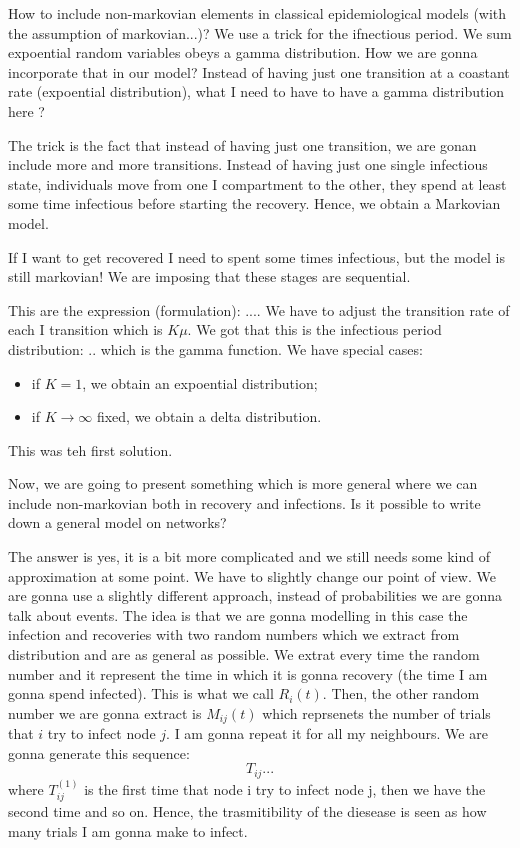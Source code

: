\documentclass[../main/main.tex]{subfiles}
\begin{document}
How to include non-markovian elements in classical epidemiological models (with the assumption of markovian...)?
We use a trick for the ifnectious period. We sum expoential random variables obeys a gamma distribution.
How we are gonna incorporate that in our model? Instead of having just one transition at a coastant rate (expoential distribution), what I need to have to have a gamma distribution here ?

The trick is the fact that instead of having just one transition, we are gonan include more and more transitions. Instead of having just one single infectious state, individuals move from one I compartment to the other, they spend at least some time infectious before starting the recovery. Hence, we obtain a Markovian model.

If I want to get recovered I need to spent some times infectious, but the model is still markovian!
We are imposing that these stages are sequential.


This are the expression (formulation):
....
We have to adjust the transition rate of each I transition which is \( K \mu  \).
We got that this is the infectious period distribution:
..
which is the gamma function.
We have special cases:
\begin{itemize}
\item if \( K=1 \), we obtain an expoential distribution;
\item if \( K \rightarrow \infty  \) fixed, we obtain a delta distribution.
\end{itemize}

This was teh first solution.


Now, we are going to present something which is more general where we can include non-markovian both in recovery and infections.
Is it possible to write down a general model on networks?

The answer is yes, it is a bit more complicated and we still needs some kind of approximation at some point. We have to slightly change our point of view. We are gonna use a slightly different approach, instead of probabilities we are gonna talk about events. The idea is that we are gonna modelling in this case the infection and recoveries with two random numbers which we extract from distribution and are as general as possible.
We extrat every time the random number and it represent the time in which it is gonna recovery (the time I am gonna spend infected).
This is what we call \( R_i (t) \). Then, the other random number we are gonna extract is \( M_{ij} (t) \) which reprsenets the number of trials that \( i \) try to infect node \( j \). I am gonna repeat it for all my neighbours. We are gonna generate this sequence:
\begin{equation*}
  T_{ij} ...
\end{equation*}
where \(  T_{ij}^{(1)} \) is the first time that node i try to infect node j, then we have the second time and so on. Hence, the trasmitibility of the diesease is seen as how many trials I am gonna make to infect.
\end{document}
